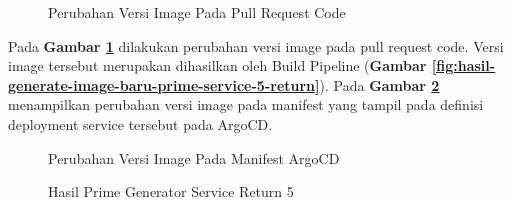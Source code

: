 \begin{figure}[H]
  \centering
  \caption{Perubahan Versi Image Pada Pull Request Code}
  \label{fig:perubahan-versi-image-pada-pull-request-code}
\end{figure}

Pada \textbf{Gambar \ref{fig:perubahan-versi-image-pada-pull-request-code}}
dilakukan perubahan versi image pada pull request code. Versi image tersebut
merupakan dihasilkan oleh Build Pipeline (\textbf{Gambar
  \ref{fig:hasil-generate-image-baru-prime-service-5-return}}). Pada
\textbf{Gambar \ref{fig:perubahan-versi-image-pada-argo}} menampilkan perubahan
versi image pada manifest yang tampil pada definisi deployment service tersebut
pada ArgoCD.

\begin{figure}[H]
  \centering
  \caption{Perubahan Versi Image Pada Manifest ArgoCD}
  \label{fig:perubahan-versi-image-pada-argo}
\end{figure}
\begin{figure}[H]
  \centering
  \caption{Hasil Prime Generator Service Return 5}
  \label{fig:hasil-prime-generator-service-return-5}
\end{figure}

